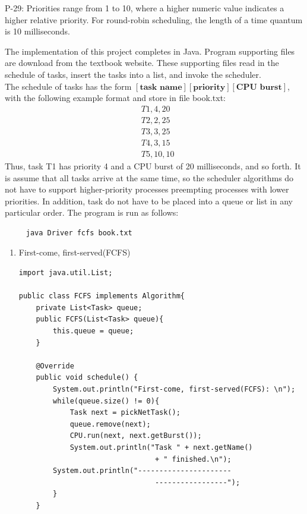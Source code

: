 \documentclass[12pt]{article}
\newenvironment{sol}[1][Solution]{\begin{trivlist}\item[\hskip\labelsep {\bfseries #1:}]}{\end{trivlist}}
\begin{document}
\begin{enumerate}
    P-29: Priorities range from 1 to 10, where a higher numeric value indicates a higher relative priority. For round-robin scheduling, the length of a time quantum is 10 milliseconds.\\
    \begin{sol}
    The implementation of this project completes in Java. Program supporting files are download from the textbook website. These supporting files read in the schedule of tasks, insert the tasks into a list, and invoke the scheduler.\\
    The schedule of tasks has the form $[\textbf{task name}][\textbf{priority}][\textbf{CPU burst}]$, with the following example format and store in file book.txt:
    \begin{align*}
        & T1, 4, 20 \\
        & T2, 2, 25 \\
        & T3, 3, 25 \\
        & T4, 3, 15 \\
        & T5, 10, 10 
    \end{align*}
    Thus, task T1 has priority 4 and a CPU burst of 20 milliseconds, and so forth. It is assume that all tasks arrive at the same time, so the scheduler algorithms do not have to support higher-priority processes preempting processes with lower priorities. In addition, task do not have to be placed into a queue or list in any particular order.
    The program is run as follows:
     \begin{verbatim}
     java Driver fcfs book.txt
    \end{verbatim}
    \begin{enumerate}
        \item First-come, first-served(FCFS)
             \begin{verbatim}
import java.util.List;

public class FCFS implements Algorithm{
    private List<Task> queue;
    public FCFS(List<Task> queue){
        this.queue = queue;
    }

    @Override
    public void schedule() {
        System.out.println("First-come, first-served(FCFS): \n");
        while(queue.size() != 0){
            Task next = pickNetTask();
            queue.remove(next);
            CPU.run(next, next.getBurst());
            System.out.println("Task " + next.getName() 
                                + " finished.\n");
	    System.out.println("----------------------
                                -----------------");
        }
    }


\end{verbatim}
\end{enumerate}
\end{sol}
\end{enumerate}
\end{document}
